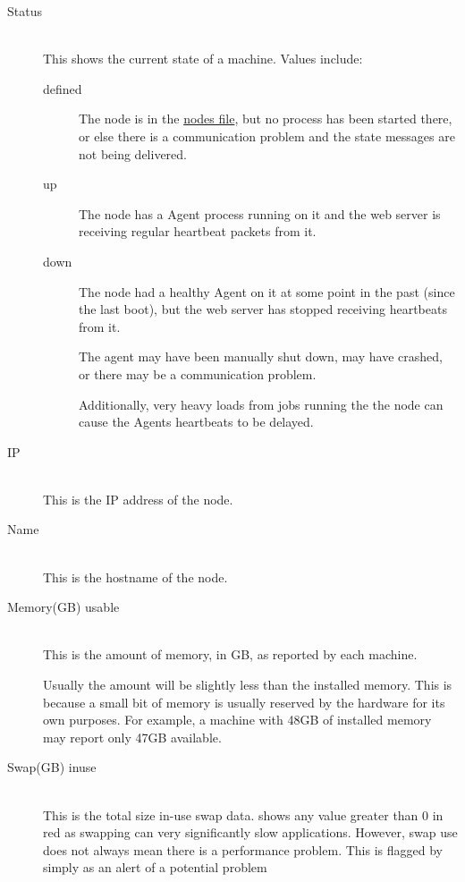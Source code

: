    \begin{description}
      \item[Status] \hfill \\
        This shows the current state of a machine.  Values include:
        \begin{description}
          \item[defined] The node is in the {\DUCC}
            \hyperref[sec:admin-ducc.nodes]{nodes file}, but no {\DUCC} process has been
            started there, or else there is a communication problem and
            the state messages are not being delivered.
            \item[up] The node has a {\DUCC} Agent process running on it and the
              web server is receiving regular heartbeat packets from it.
            \item[down] The node had a healthy {\DUCC} Agent on it at some point
              in the past (since the last {\DUCC} boot), but the web server has stopped
              receiving heartbeats from it. 

              The agent may have been manually shut down, may have crashed, or there
              may be a communication problem.

              Additionally, very heavy loads from jobs running the the node can cause
              the {\DUCC} Agents heartbeats to be delayed.
        \end{description}


      \item[IP] \hfill \\
        This is the IP address of the node.


      \item[Name] \hfill \\
        This is the hostname of the node.


      \item[Memory(GB) usable] \hfill \\
        This is the amount of memory, in GB, as reported by each machine.
        
        Usually the amount will be slightly less than the installed memory.  This is because
        a small bit of memory is usually reserved by the hardware for its own purposes.  For 
        example, a machine with 48GB of installed memory may report only 47GB available.


      \item[Swap(GB) inuse] \hfill \\
        This is the total size in-use swap data.  {\DUCC} shows any value greater than 0 in
        red as swapping can very significantly slow applications.  However, swap use does
        not always mean there is a performance problem.  This is flagged by {\DUCC} simply
        as an alert of a potential problem



\end{description}
